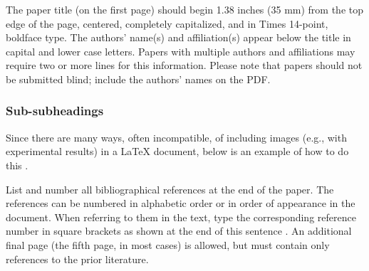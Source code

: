 \documentclass{article}
\begin{document}
The paper title (on the first page) should begin 1.38 inches (35 mm) from the
top edge of the page, centered, completely capitalized, and in Times 14-point,
boldface type.  The authors' name(s) and affiliation(s) appear below the title
in capital and lower case letters.  Papers with multiple authors and
affiliations may require two or more lines for this information. Please note
that papers should not be submitted blind; include the authors' names on the
PDF.

\subsubsection{Sub-subheadings}
\label{sssec:subsubhead}
Since there are many ways, often incompatible, of including images (e.g., with
experimental results) in a LaTeX document, below is an example of how to do
this \cite{dalal2005histograms}.

List and number all bibliographical references at the end of the
paper. The references can be numbered in alphabetic order or in
order of appearance in the document. When referring to them in
the text, type the corresponding reference number in square
brackets as shown at the end of this sentence \cite{dalal2005histograms}\cite{bai2018sod,bai2014saliency,cui2016defect,cui2016novel,cui2018tire,dalal2005histograms,ghorai2012automatic,guo2012tire,guo2016defect,kumar2008computer,li2016deformable,lin2017feature,liu2016ssd,long2015fully,lowe2004distinctive,ngan2011automated,tsai2012defect,wang2019tire,xiang2014dictionary,yan2013detection,zhang2013defect,zhang2015automatic,zhang2013texture,zhang2018tire,zhao2017tire,zhou2018scale,chen2016attention}. An
additional final page (the fifth page, in most cases) is
allowed, but must contain only references to the prior
literature.
\end{document}

